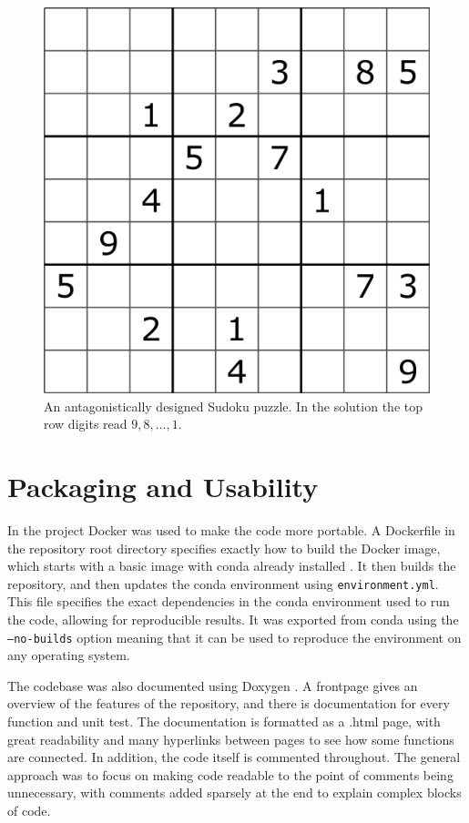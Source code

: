 \documentclass[12pt]{article}
\begin{document}
\begin{figure}[hbt]
    \includegraphics[scale=0.3]{Sudoku_puzzle_hard_for_brute_force.png}
    \caption{An antagonistically designed Sudoku puzzle. In the solution the top row digits read $9, 8, \ldots, 1$\cite{antagonist}.}
    \label{antagonist_clues}
\end{figure}

\section*{Packaging and Usability}

In the project Docker was used to make the code more portable.
A Dockerfile in the repository root directory specifies exactly how to build the Docker image, which starts with a basic image with conda already installed \cite{docker}.
It then builds the repository, and then updates the conda environment using \texttt{environment.yml}.
This file specifies the exact dependencies in the conda environment used to run the code, allowing for reproducible results.
It was exported from conda using the \texttt{--no-builds} option meaning that it can be used to reproduce the environment on any operating system.

The codebase was also documented using Doxygen \cite{doxygen}.
A frontpage gives an overview of the features of the repository, and there is documentation for every function and unit test.
The documentation is formatted as a .html page, with great readability and many hyperlinks between pages to see how some functions are connected.
In addition, the code itself is commented throughout.
The general approach was to focus on making code readable to the point of comments being unnecessary, with comments added sparsely at the end to explain complex blocks of code.
\end{document}
